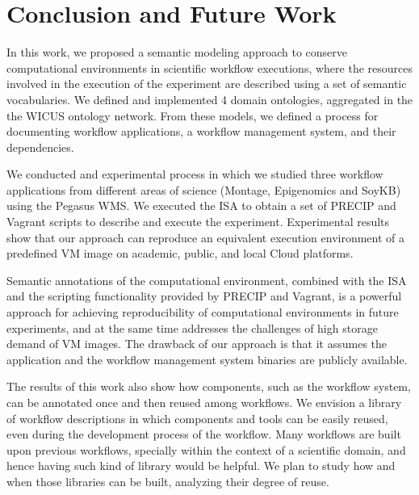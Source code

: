 \section{Conclusion and Future Work}
\label{sec:conclusion}



In this work, we proposed a semantic modeling approach to conserve computational environments in scientific workflow executions, where  the resources involved in the execution of the experiment are described using a set of semantic vocabularies. We defined and implemented 4 domain ontologies, aggregated in the the WICUS ontology network. From these models, we defined a process for documenting workflow applications, a workflow management system, and their dependencies. 

We conducted and experimental process in which we studied three workflow applications from different areas of science (Montage, Epigenomics and SoyKB) using the Pegasus WMS. We executed the ISA to obtain a set of PRECIP and Vagrant scripts to describe and execute the experiment. Experimental results show that our approach can reproduce an equivalent execution environment of a predefined VM image on academic, public, and local Cloud platforms.

Semantic annotations of the computational environment, combined with the ISA and the scripting functionality provided by PRECIP and Vagrant, is a powerful approach for achieving reproducibility of computational environments in future experiments, and at the same time addresses the challenges of high storage demand of VM images. The drawback of our approach is that it assumes the application and the workflow management system binaries are publicly available.

The results of this work also show how components, such as the workflow system, can be annotated once and then reused among workflows. We envision a library of workflow descriptions in which components and tools can be easily reused, even during the development process of the workflow. Many workflows are built upon previous workflows, specially within the context of a scientific domain, and hence having such kind of library would be helpful. We plan to study how and when those libraries can be built, analyzing their degree of reuse.


